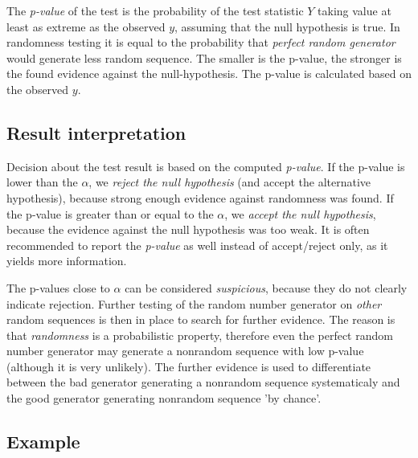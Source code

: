 \documentclass[
  digital,     %
  oneside,     %
  nosansbold,  %
  nocolorbold, %
  nolof,         %
  nolot,         %
]{fithesis4}
\begin{document}

The \emph{p-value} of the test is the probability of the test statistic $Y$ taking value at least as extreme as the observed $y$, assuming that the null hypothesis is true. In randomness testing it is equal to the probability that \emph{perfect random generator} would generate less random sequence. The smaller is the p-value, the stronger is the found evidence against the null-hypothesis. \cite[p. 386]{basic_practice} The p-value is calculated based on the observed $y$.



\subsection{Result interpretation}

Decision about the test result is based on the computed \emph{p-value}. If the p-value is lower than the $\alpha$, we \emph{reject the null hypothesis} (and accept the alternative hypothesis), because strong enough evidence against randomness was found. If the p-value is greater than or equal to the $\alpha$, we \emph{accept the null hypothesis}, because the evidence against the null hypothesis was too weak. \cite[p. 390]{basic_practice} It is often recommended to report the \emph{p-value} as well instead of accept/reject only, as it yields more information. \cite[p. 90]{tu01_guide}


The p-values close to $\alpha$ can be considered \emph{suspicious}, because they do not clearly indicate rejection. Further testing of the random number generator on \emph{other} random sequences is then in place to search for further evidence. \cite[p. 5]{tu01_paper} The reason is that \emph{randomness} is a probabilistic property, therefore even the perfect random number generator may generate a nonrandom sequence with low p-value (although it is very unlikely). The further evidence is used to differentiate between the bad generator generating a nonrandom sequence systematicaly and the good generator generating nonrandom sequence 'by chance'. \cite[p. 90]{tu01_guide}




\subsection{Example}
\end{document}
